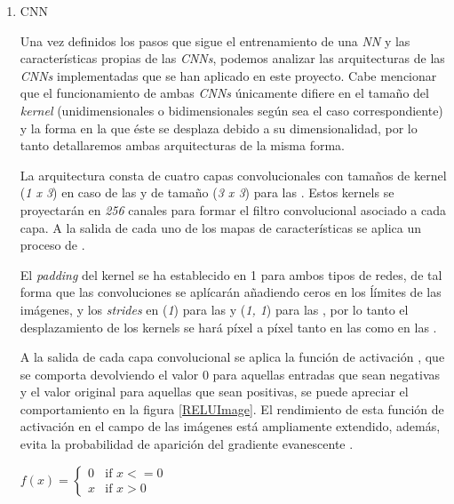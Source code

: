 \begin{enumerate}
\begin{enumerate}
                \item CNN

                    Una vez definidos los pasos que sigue el entrenamiento de una \textit{NN} y las características propias de las \textit{CNNs}, podemos analizar las arquitecturas de las \textit{CNNs} implementadas que se han aplicado en este proyecto. Cabe mencionar que el funcionamiento de ambas \textit{CNNs} únicamente difiere en el tamaño del \textit{kernel} (unidimensionales o bidimensionales según sea el caso correspondiente) y la forma en la que éste se desplaza debido a su dimensionalidad, por lo tanto detallaremos ambas arquitecturas de la misma forma.

                    La arquitectura consta de cuatro capas convolucionales con tamaños de kernel (\textit{1 x 3}) en caso de las  y de tamaño (\textit{3 x 3}) para las . Estos kernels se proyectarán en \textit{256} canales para formar el filtro convolucional asociado a cada capa. A la salida de cada uno de los mapas de características se aplica un proceso de .

                    El \textit{padding} del kernel se ha establecido en 1 para ambos tipos de redes, de tal forma que las convoluciones se aplícarán añadiendo ceros en los ĺímites de las imágenes, y los \textit{strides} en (\textit{1}) para las  y (\textit{1, 1}) para las , por lo tanto el desplazamiento de los kernels se hará píxel a píxel tanto en las  como en las .

                    A la salida de cada capa convolucional se aplica la función de activación , que se comporta devolviendo el valor $0$ para aquellas entradas que sean negativas y el valor original para aquellas que sean positivas, se puede apreciar el comportamiento en la figura \ref{RELUImage}. El rendimiento de esta función de activación en el campo de las imágenes está ampliamente extendido, además, evita la probabilidad de aparición del gradiente evanescente \cite{GradientVanishingRelu}.

                    \begin{center}
                        $f(x) = \left\{
                                       \begin{array}{lr}
                                         0 & \text{if } x<=0\\
                                         x & \text{if } x>0
                                       \end{array}
                                \right.$
                    \end{center}


\end{enumerate}
\end{enumerate}
